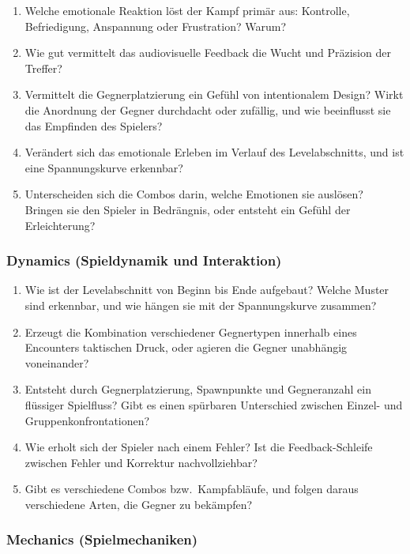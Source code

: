 \documentclass[../Main.tex]{subfiles}
\begin{document}
\begin{enumerate}[label=\textbf{A\arabic*}, leftmargin=1.5cm, itemsep=0.5em]
    \item Welche emotionale Reaktion löst der Kampf primär aus: Kontrolle, Befriedigung, Anspannung oder Frustration? Warum?
    \item Wie gut vermittelt das audiovisuelle Feedback die Wucht und Präzision der Treffer?
    \item Vermittelt die Gegnerplatzierung ein Gefühl von intentionalem Design? Wirkt die Anordnung der Gegner durchdacht oder zufällig, und wie beeinflusst sie das Empfinden des Spielers?
    \item Verändert sich das emotionale Erleben im Verlauf des Levelabschnitts, und ist eine Spannungskurve erkennbar?
    \item Unterscheiden sich die Combos darin, welche Emotionen sie auslösen? Bringen sie den Spieler in Bedrängnis, oder entsteht ein Gefühl der Erleichterung?
\end{enumerate}

\subsubsection{Dynamics (Spieldynamik und Interaktion)}

\begin{enumerate}[label=\textbf{D\arabic*}, leftmargin=1.5cm, itemsep=0.5em]
    \item Wie ist der Levelabschnitt von Beginn bis Ende aufgebaut? Welche Muster sind erkennbar, und wie hängen sie mit der Spannungskurve zusammen?
    \item Erzeugt die Kombination verschiedener Gegnertypen innerhalb eines Encounters taktischen Druck, oder agieren die Gegner unabhängig voneinander?
    \item Entsteht durch Gegnerplatzierung, Spawnpunkte und Gegneranzahl ein flüssiger Spielfluss? Gibt es einen spürbaren Unterschied zwischen Einzel- und Gruppenkonfrontationen?
    \item Wie erholt sich der Spieler nach einem Fehler? Ist die Feedback-Schleife zwischen Fehler und Korrektur nachvollziehbar?
    \item Gibt es verschiedene Combos bzw.\ Kampfabläufe, und folgen daraus verschiedene Arten, die Gegner zu bekämpfen?
\end{enumerate}

\subsubsection{Mechanics (Spielmechaniken)}
\end{document}
